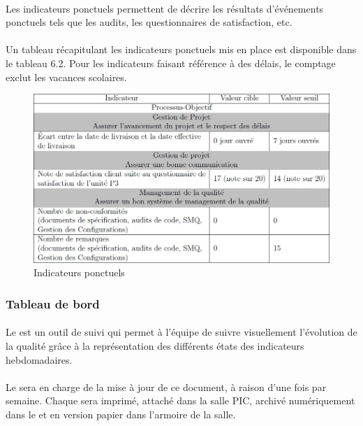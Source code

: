 \paragraph*{} Les indicateurs ponctuels permettent de décrire les résultats d’événements ponctuels tels que les audits, les questionnaires de satisfaction, etc.

\paragraph*{} Un tableau récapitulant les indicateurs ponctuels mis en place est disponible dans le tableau
6.2. Pour les indicateurs faisant référence à des délais, le comptage exclut les vacances scolaires.
\begin{figure}[h]
   \center
   \caption{\label{Tableau 6.2} Indicateurs ponctuels}
   \includegraphics[width=13cm]{./images/indicateurs_ponctuels.jpg}
\end{figure}

\subsubsection*{Tableau de bord}
\label{Tableau de bord}

\paragraph*{} Le \TB{} est un outil de suivi qui permet à l'équipe \nomEquipe{} de suivre visuellement l'évolution de la qualité grâce à la représentation des différents états des indicateurs
hebdomadaires.

\paragraph*{} Le \RQ{} sera en charge de la mise à jour de ce document, à raison d'une
fois par semaine. Chaque \TB{} sera imprimé, attaché dans la salle PIC, archivé
numériquement dans le \DSQ{} et en version papier dans l'armoire de la salle.

